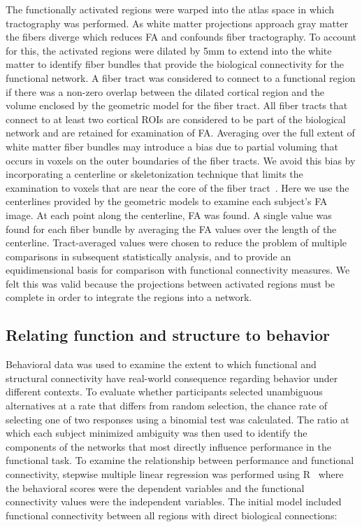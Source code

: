 The functionally activated regions were warped into the atlas space in which tractography was performed. As white matter projections approach gray matter the fibers diverge which reduces FA and confounds fiber tractography. To account for this, the activated regions were dilated by 5mm to extend into the white matter to identify fiber bundles that provide the biological connectivity for the functional network. A fiber tract was considered to connect to a functional region if there was a non-zero overlap between the dilated cortical region and the volume enclosed by the geometric model for the fiber tract.  All fiber tracts that connect to at least two cortical ROIs are considered to be part of the biological network and are retained for examination of FA. Averaging over the full extent of white matter fiber bundles may introduce a bias due to partial voluming that occurs in voxels on the outer boundaries of the fiber tracts. We avoid this bias by incorporating a centerline or skeletonization technique that limits the examination to voxels that are near the core of the fiber tract~\cite{Smith2006,Yushkevich2008}. Here we use the centerlines provided by the geometric models to examine each subject's FA image. At each point along the centerline, FA was found. A single value was found for each fiber bundle by averaging the FA values over the length of the centerline. Tract-averaged values were chosen to reduce the problem of multiple comparisons in subsequent statistically analysis, and to provide an equidimensional basis for comparison with functional connectivity measures. We felt this was valid because the projections between activated regions must be complete in order to integrate the regions into a network.

\subsection{Relating function and structure to behavior}
Behavioral data was used to examine the extent to which functional and structural connectivity have real-world consequence regarding behavior under different contexts. To evaluate whether participants selected unambiguous alternatives at a rate that differs from random selection, the chance rate of selecting one of two responses using a binomial test was calculated. The ratio at which each subject minimized ambiguity was then used to identify the components of the networks that most directly influence performance in the functional task. To examine the relationship between performance and functional connectivity, stepwise multiple linear regression was performed using R~\cite{RStats} where the behavioral scores were the dependent variables and the functional connectivity values were the independent variables.  The initial model included functional connectivity between all regions with direct biological connections:

